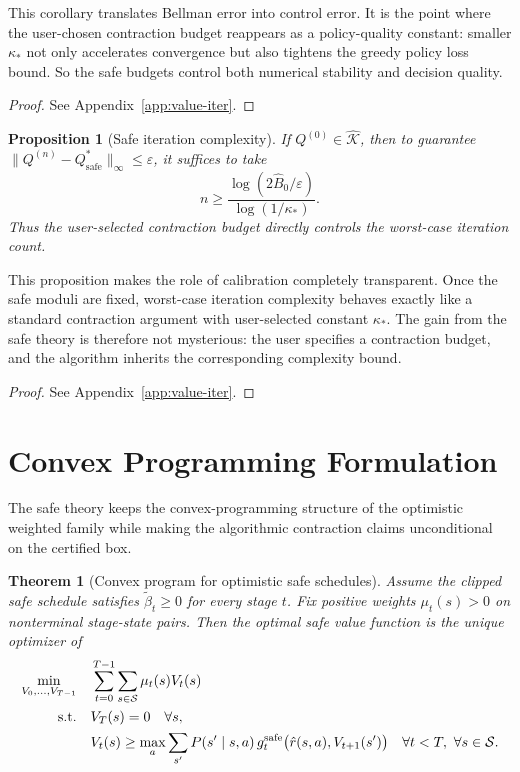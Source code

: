 \documentclass{article}
\newtheorem{theorem}{Theorem}[section]
\newtheorem{proposition}[proposition]{Proposition}
\theoremstyle{remark}
\newcommand{\cS}{\mathcal{S}}
\newcommand{\safe}{\mathrm{safe}}
\newcommand{\Ksafe}{\widehat{\mathcal K}}
\newcommand{\Bhat}{\widehat B}
\begin{document}
This corollary translates Bellman error into control error.
It is the point where the user-chosen contraction budget reappears as a policy-quality constant: smaller $\kappa_*$ not only accelerates convergence but also tightens the greedy policy loss bound.
So the safe budgets control both numerical stability and decision quality.

\begin{proof}
See Appendix~\ref{app:value-iter}.
\end{proof}

\begin{proposition}[Safe iteration complexity]
\label{prop:vi-complexity}
If $Q^{(0)}\in\Ksafe$, then to guarantee $\|Q^{(n)}-Q_\safe^*\|_\infty \le \varepsilon$, it suffices to take
\begin{equation}
n \ge \frac{\log(2\Bhat_0/\varepsilon)}{\log(1/\kappa_*)}.
\label{eq:safe-vi-iter-count}
\end{equation}
Thus the user-selected contraction budget directly controls the worst-case iteration count.
\end{proposition}

This proposition makes the role of calibration completely transparent.
Once the safe moduli are fixed, worst-case iteration complexity behaves exactly like a standard contraction argument with user-selected constant $\kappa_*$.
The gain from the safe theory is therefore not mysterious: the user specifies a contraction budget, and the algorithm inherits the corresponding complexity bound.

\begin{proof}
See Appendix~\ref{app:value-iter}.
\end{proof}

\section{Convex Programming Formulation}
\label{sec:lp}

The safe theory keeps the convex-programming structure of the optimistic weighted family while making the algorithmic contraction claims unconditional on the certified box.

\begin{theorem}[Convex program for optimistic safe schedules]
\label{thm:lse-cp}
Assume the clipped safe schedule satisfies $\widetilde\beta_t\ge 0$ for every stage $t$.
Fix positive weights $\mu_t(s)>0$ on nonterminal stage-state pairs.
Then the optimal safe value function is the unique optimizer of
\begin{align}
\min_{V_0,\dots,V_{T-1}}\quad & \sum_{t=0}^{T-1}\sum_{s\in\cS} \mu_t(s)V_t(s)
\nonumber\\
\textnormal{s.t.}\quad & V_T(s)=0 \quad \forall s,
\nonumber\\
& V_t(s) \ge \max_a \sum_{s'}P(s'\mid s,a)\,g_t^{\safe}\bigl(\hat r(s,a),V_{t+1}(s')\bigr)
\quad \forall t<T,\ \forall s\in\cS.
\label{eq:safe-cp}
\end{align}
\end{theorem}
\end{document}
